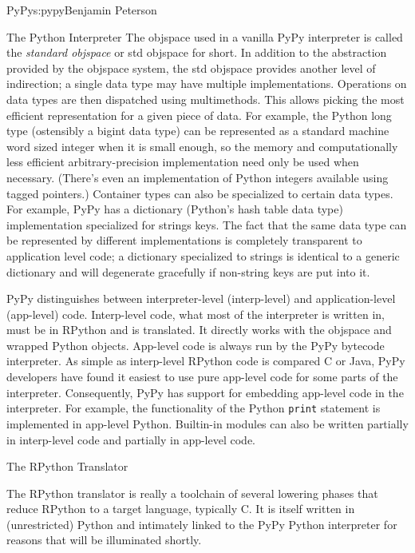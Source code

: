 \begin{aosachapter}{PyPy}{s:pypy}{Benjamin Peterson}
\begin{aosasect1}{The Python Interpreter}
The objspace used in a vanilla PyPy interpreter is called the \emph{standard
  objspace} or std objspace for short. In addition to the abstraction provided
by the objspace system, the std objspace provides another level of indirection;
a single data type may have multiple implementations. Operations on data types
are then dispatched using multimethods. This allows picking the most efficient
representation for a given piece of data. For example, the Python long type
(ostensibly a bigint data type) can be represented as a standard machine word
sized integer when it is small enough, so the memory and computationally less
efficient arbitrary-precision implementation need only be used when
necessary. (There's even an implementation of Python integers available using
tagged pointers.) Container types can also be specialized to certain data
types. For example, PyPy has a dictionary (Python's hash table data type)
implementation specialized for strings keys. The fact that the same data type
can be represented by different implementations is completely transparent to
application level code; a dictionary specialized to strings is identical to a
generic dictionary and will degenerate gracefully if non-string keys are put
into it.

PyPy distinguishes between interpreter-level (interp-level) and
application-level (app-level) code. Interp-level code, what most of the
interpreter is written in, must be in RPython and is translated. It directly
works with the objspace and wrapped Python objects. App-level code is always run
by the PyPy bytecode interpreter. As simple as interp-level RPython code is
compared C or Java, PyPy developers have found it easiest to use pure app-level
code for some parts of the interpreter. Consequently, PyPy has support for
embedding app-level code in the interpreter. For example, the functionality of
the Python \verb+print+ statement is implemented in app-level Python. Builtin-in
modules can also be written partially in interp-level code and partially in
app-level code.

\end{aosasect1}

\begin{aosasect1}{The RPython Translator}
\label{sec:translator}

The RPython translator is really a toolchain of several lowering phases that
reduce RPython to a target language, typically C. It is itself written in
(unrestricted) Python and intimately linked to the PyPy Python interpreter for
reasons that will be illuminated shortly.


\end{aosasect1}
\end{aosachapter}
